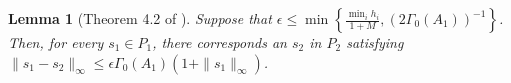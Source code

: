 \documentclass{article}
\newtheorem{lemma}[theorem]{Lemma}
\theoremstyle{case}
\begin{document}



\begin{lemma}[Theorem 4.2 of \cite{dummy:perturbations}]
\label{4_2}
Suppose that $\epsilon\le \min\left\{\frac{\min_i h_i}{1 + M},\left(2\Gamma_0(A_1)\right)^{-1}\right\}$.
Then, for every $s_1 \in P_1$,
there corresponds an $s_2$ in $P_2$ satisfying 
$\|s_1 - s_2\|_{\infty}\le \epsilon\Gamma_0(A_1)\left(1 + \|s_1\|_{\infty}\right)$.
\end{lemma}
\end{document}
